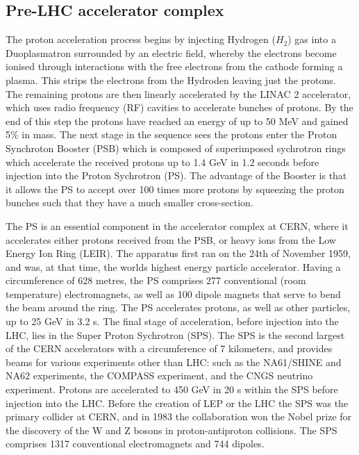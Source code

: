 \subsection{Pre-LHC accelerator complex}

The proton acceleration process begins by injecting Hydrogen ($H_2$) gas into a Duoplasmatron surrounded by an electric field, whereby the electrons become ionised through interactions with the free electrons from the cathode forming a plasma. This strips the electrons from the Hydroden leaving just the protons. The remaining protons are then linearly accelerated by the LINAC 2 accelerator, which uses radio frequency (RF) cavities to accelerate bunches of protons. By the end of this step the protons have reached an energy of up to 50 MeV and gained 5\% in mass. The next stage in the sequence sees the protons enter the Proton Synchroton Booster (PSB) which is composed of superimposed sychrotron rings which accelerate the received protons up to 1.4 GeV in 1.2 seconds before injection into the Proton Sychrotron (PS). The advantage of the Booster is that it allows the PS to accept over 100 times more protons by squeezing the proton bunches such that they have a much smaller cross-section. 

The PS is an essential component in the accelerator complex at CERN, where it accelerates either protons received from the PSB, or heavy ions from the Low Energy Ion Ring (LEIR). The apparatus first ran on the 24th of November 1959, and was, at that time, the worlds highest energy particle accelerator. Having a circumference of 628 metres, the PS comprises 277 conventional (room temperature) electromagnets, as well as 100 dipole magnets that serve to bend the beam around the ring. The PS accelerates protons, as well as other particles, up to 25 GeV in 3.2 s. The final stage of acceleration, before injection into the LHC, lies in the Super Proton Sychrotron (SPS). The SPS is the second largest of the CERN accelerators with a circumference of 7 kilometers, and provides beams for various experiments other than LHC: such as the NA61/SHINE and NA62 experiments, the COMPASS experiment, and the CNGS neutrino experiment. Protons are accelerated to 450 GeV  in 20 s within the SPS before injection into the LHC. Before the creation of LEP or the LHC the SPS was the primary collider at CERN, and in 1983 the collaboration won the Nobel prize for the discovery of the W and Z bosons in proton-antiproton collisions. The SPS comprises 1317 conventional electromagnets and 744 dipoles.

